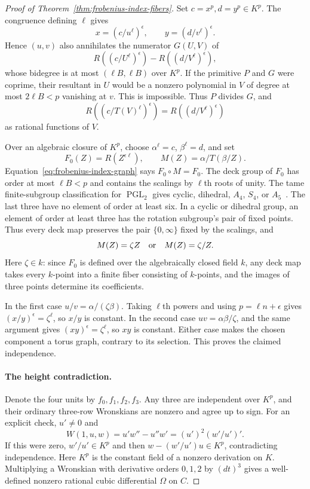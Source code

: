 \documentclass[11pt,letterpaper]{article}
\theoremstyle{definition}
\theoremstyle{remark}
\begin{document}
\begin{proof}[Proof of Theorem~\ref{thm:frobenius-index-fibers}]
Set $c=x^p,d=y^p\in K^p$. The congruence defining $\ell$ gives
\[
 x=(c/u^\ell)^\epsilon,\qquad
 y=(d/v^\ell)^\epsilon.
\]
Hence $(u,v)$ also annihilates the numerator $G(U,V)$ of
\[
 R((c/U^\ell)^\epsilon)-R((d/V^\ell)^\epsilon),
\]
whose bidegree is at most $(\ell B,\ell B)$ over $K^p$.
If the primitive $P$ and $G$ were coprime, their resultant in $U$
would be a nonzero polynomial in $V$ of degree at most $2\ell B<p$
vanishing at $v$. This is impossible. Thus $P$ divides $G$, and
\begin{equation}\label{eq:frobenius-index-graph}
 R((c/T(V)^\ell)^\epsilon)=R((d/V^\ell)^\epsilon)
\end{equation}
as rational functions of $V$.

Over an algebraic closure of $K^p$, choose
$\alpha^\ell=c$, $\beta^\ell=d$, and set
\[
 F_0(Z)=R(Z^{\epsilon\ell}),\qquad
 M(Z)=\alpha/T(\beta/Z).
\]
Equation~\eqref{eq:frobenius-index-graph} says $F_0\circ M=F_0$.
The deck group of $F_0$ has order at most $\ell B<p$ and contains
the scalings by $\ell$th roots of unity. The tame finite-subgroup
classification for $\operatorname{PGL}_2$ gives cyclic, dihedral,
$A_4$, $S_4$, or $A_5$~\cite{beauville-pgl2}.
The last three have no element of order at least six. In a cyclic
or dihedral group, an element of order at least three has the
rotation subgroup's pair of fixed points. Thus every deck map
preserves the pair $\{0,\infty\}$ fixed by the scalings, and
\[
 M(Z)=\zeta Z\quad\hbox{or}\quad M(Z)=\zeta/Z.
\]
Here $\zeta\in k$: since $F_0$ is defined over the algebraically
closed field $k$, any deck map takes every $k$-point into a
finite fiber consisting of $k$-points, and the images of three
points determine its coefficients.

In the first case $u/v=\alpha/(\zeta\beta)$. Taking $\ell$th
powers and using $p=\ell n+\epsilon$ gives
$(x/y)^\epsilon=\zeta^\ell$, so $x/y$ is constant.
In the second case $uv=\alpha\beta/\zeta$, and the same argument
gives $(xy)^\epsilon=\zeta^\ell$, so $xy$ is constant.
Either case makes the chosen component a torus graph, contrary to
its selection. This proves the claimed independence.

\paragraph{The height contradiction.}
Denote the four units by $f_0,f_1,f_2,f_3$. Any three are independent
over $K^p$, and their ordinary three-row Wronskians are nonzero
and agree up to sign. For an explicit check, $u'\ne0$ and
\[
 W(1,u,w)=u'w''-u''w'=(u')^2(w'/u')'.
\]
If this were zero, $w'/u'\in K^p$ and then
$w-(w'/u')u\in K^p$, contradicting independence.
Here $K^p$ is the constant field of a nonzero derivation on $K$.
Multiplying a Wronskian with derivative
orders $0,1,2$ by $(dt)^3$ gives a well-defined nonzero rational
cubic differential $\Omega$ on $C$.


\end{proof}
\end{document}
